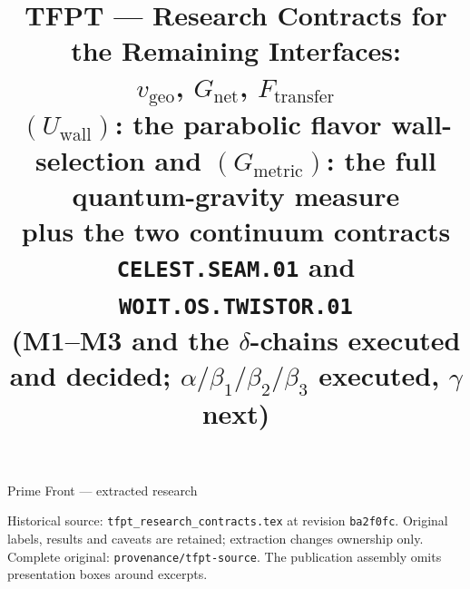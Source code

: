 \documentclass[11pt,a4paper]{article}
\title{\vspace{-1.2cm}\textbf{TFPT --- Research Contracts for the Remaining Interfaces:\\$v_{\mathrm{geo}}$, $G_{\mathrm{net}}$, $F_{\mathrm{transfer}}$}\\[2mm]
\large $(U_{\mathrm{wall}})$: the parabolic flavor wall-selection \quad and\quad
$(G_{\mathrm{metric}})$: the full quantum-gravity measure\\[1mm]
\large plus the two continuum contracts \texttt{CELEST.SEAM.01} and \texttt{WOIT.OS.TWISTOR.01}\\
(M1--M3 and the $\delta$-chains executed and decided; $\alpha/\beta_1/\beta_2/\beta_3$ executed, $\gamma$ next)}
\author{\TFPTauthors}\date{\TFPTdatestamp}
\begin{document}
\begin{center}\Large Prime Front --- extracted research\end{center}
\noindent Historical source: \texttt{tfpt\_research\_contracts.tex} at revision \texttt{ba2f0fc}. Original labels, results and caveats are retained; extraction changes ownership only. Complete original: \texttt{provenance/tfpt-source}. The publication assembly omits presentation boxes around excerpts.
\tableofcontents
\clearpage

\end{document}
